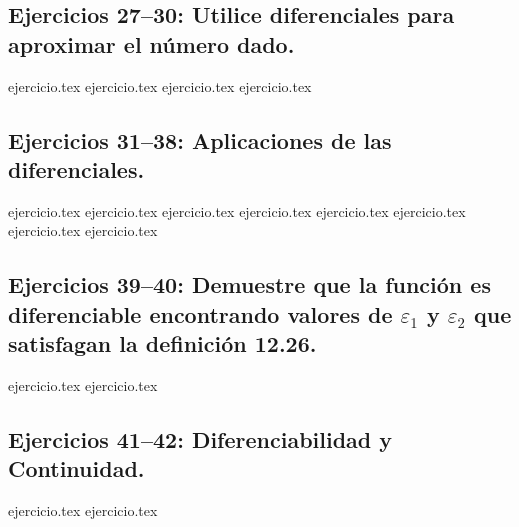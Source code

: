 \subsection*{Ejercicios 27--30: Utilice diferenciales para aproximar el número dado.}
\begin{enumerate}
    \setcounter{enumi}{26}
    {ejercicio.tex}
    {ejercicio.tex}
    {ejercicio.tex}
    {ejercicio.tex}
\end{enumerate}

\subsection*{Ejercicios 31--38: Aplicaciones de las diferenciales.}
\begin{enumerate}
    \setcounter{enumi}{30}
    {ejercicio.tex}
    {ejercicio.tex}
    {ejercicio.tex}
    {ejercicio.tex}
    {ejercicio.tex}
    {ejercicio.tex}
    {ejercicio.tex}
    {ejercicio.tex}
\end{enumerate}

\subsection*{Ejercicios 39--40: Demuestre que la función es diferenciable encontrando valores de $\varepsilon_1$ y $\varepsilon_2$ que satisfagan la definición 12.26.}
\begin{enumerate}
    \setcounter{enumi}{38}
    {ejercicio.tex}
    {ejercicio.tex}
\end{enumerate}

\subsection*{Ejercicios 41--42: Diferenciabilidad y Continuidad.}
\begin{enumerate}
    \setcounter{enumi}{40}
    {ejercicio.tex}
    {ejercicio.tex}
\end{enumerate}
